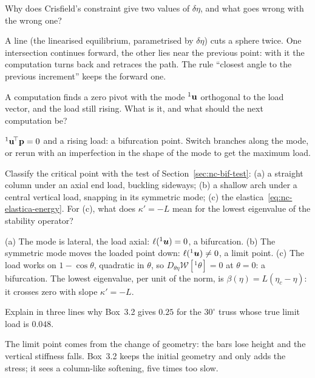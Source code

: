 \label{exo:nc-root}
%
Why does Crisfield's constraint give two values of $\delta\eta$, and what goes wrong with the
wrong one?
\begin{solution}
A line (the linearised equilibrium, parametrised by $\delta\eta$) cuts a sphere twice. One
intersection continues forward, the other lies near the previous point: with it the
computation turns back and retraces the path. The rule ``closest angle to the previous
increment'' keeps the forward one.
\end{solution}

\label{exo:nc-classify}
%
A computation finds a zero pivot with the mode ${}^1\mathbf{u}$ orthogonal to the load vector,
and the load still rising. What is it, and what should the next computation be?
\begin{solution}
${}^1\mathbf{u}^{\!\top}\mathbf{p} = 0$ and a rising load: a bifurcation point. Switch branches along the mode,
or rerun with an imperfection in the shape of the mode to get the maximum load.
\end{solution}

\label{exo:nc-work}
%
Classify the critical point with the test of Section~\ref{sec:nc-bif-test}: (a) a straight column
under an axial end load, buckling sideways; (b) a shallow arch under a central vertical load,
snapping in its symmetric mode; (c) the elastica~\eqref{eq:nc-elastica-energy}. For (c), what
does $\kappa' = -L$ mean for the lowest eigenvalue of the stability operator?
\begin{solution}
(a) The mode is lateral, the load axial: $\ell({}^1\bm{u}) = 0$, a bifurcation. (b) The symmetric mode
moves the loaded point down: $\ell({}^1\bm{u}) \neq 0$, a limit point. (c) The load works on
$1 - \cos\theta$, quadratic in $\theta$, so $D_{\theta\eta}\mathcal{W}[{}^1\theta] = 0$ at $\theta = 0$:
a bifurcation. The lowest eigenvalue, per unit of the norm, is $\beta(\eta) = L(\eta_c - \eta)$:
it crosses zero with slope $\kappa' = -L$.
\end{solution}

\label{exo:nc-snap}
%
Explain in three lines why Box~3.2 gives $0.25$ for the $30^\circ$ truss whose true limit
load is $0.048$.
\begin{solution}
The limit point comes from the change of geometry: the bars lose height and the vertical
stiffness falls. Box~3.2 keeps the initial geometry and only adds the stress; it sees a
column-like softening, five times too slow.
\end{solution}

